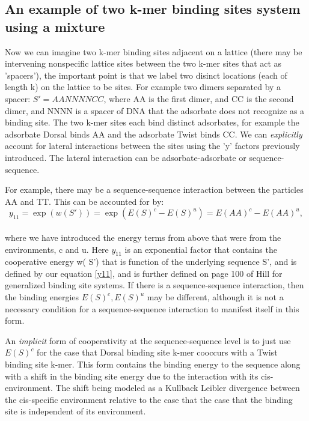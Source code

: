 \subsection*{An example of two k-mer binding sites system using a mixture}
Now we can imagine two k-mer binding sites adjacent on a lattice (there may be intervening nonspecific lattice sites between the two k-mer sites that act as 'spacers'), the important point is that we label two disinct locations (each of length k) on the lattice to be sites.  For example two dimers separated by a spacer: $S'= AANNNNCC$, where AA is the first dimer, and CC is the second dimer, and NNNN is a spacer of DNA that the adsorbate does not recognize as a binding site.  The two k-mer sites each bind distinct adsorbates, for example the adsorbate Dorsal binds AA and the adsorbate Twist binds CC.  We can \textit{explicitly} account for lateral interactions between the sites using the 'y' factors previously introduced.  The lateral interaction can be adsorbate-adsorbate or sequence-sequence.

For example, there may be a sequence-sequence interaction between the particles AA and TT.  This can be accounted for by:
\begin{equation}\label{}
  y_{11} =\exp( w(S') ) = \exp( E(S)^c - E(S)^u )= E(AA)^c-E(AA)^u,
\end{equation}
\\
where we have introduced the energy terms from above that were from the environments, c and u. Here $y_{11}$ is an exponential factor that contains the cooperative energy w(
S') that is function of the underlying sequence S', and is defined by our equation \eqref{y11}, and is further defined on page 100 of Hill\cite{hill} for generalized binding site systems.  If there is a sequence-sequence interaction, then the binding energies $E(S)^c, E(S)^u$ may be different, although it is not a necessary condition for a sequence-sequence interaction to manifest itself in this form.

An \textit{implicit} form of cooperativity at the sequence-sequence level is to just use $E(S)^c$ for the case that Dorsal binding site k-mer cooccurs with a Twist binding site k-mer.  This form contains the binding energy to the sequence along with a shift in the binding site energy due to the interaction with its cis-environment.  The shift being modeled as a Kullback Leibler divergence between the cis-specific environment relative to the case that the case that the binding site is independent of its environment.
